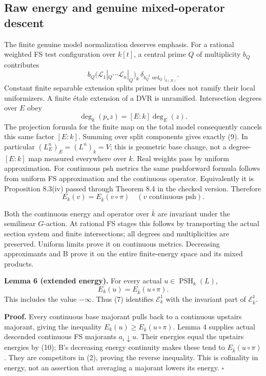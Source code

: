 \documentclass[
  11pt,
]{article}
\begin{document}
\subsection{Raw energy and genuine mixed-operator
descent}\label{raw-energy-and-genuine-mixed-operator-descent}

The finite genuine model normalization deserves emphasis. For a rational
weighted FS test configuration over \(k[t]\), a central prime \(Q\) of
multiplicity \(b_Q\) contributes \[
 b_Q\bigl(\mathcal L_1|_Q\cdots\mathcal L_n|_Q\bigr)_k\,
       \delta_{b_Q^{-1}\operatorname{ord}_Q|_{k(X)}}.
 \tag{9}
\] Constant finite separable extension splits primes but does not ramify
their local uniformizers. A finite étale extension of a DVR is
unramified. Intersection degrees over \(E\) obey \[
 \deg_k(p_*z)=[E:k]\deg_E(z).
\] The projection formula for the finite map on the total model
consequently cancels this same factor \([E:k]\). Summing over split
components gives exactly (9). In particular \((L_E^n)_E=(L^n)_k=V\);
this is geometric base change, not a degree-\([E:k]\) map measured
everywhere over \(k\). Real weights pass by uniform approximation. For
continuous psh metrics the same pushforward formula follows from uniform
FS approximation and the continuous operator. Equivalently it is
Proposition 8.3(iv) passed through Theorem 8.4 in the checked version.
Therefore \[
 E_k(v)=E_{\bar k}(v\circ\pi)
 \quad(v\text{ continuous psh}).
 \tag{10}
\]

Both the continuous energy and operator over \(\bar k\) are invariant
under the semilinear \(G\)-action. At rational FS stages this follows by
transporting the actual section system and finite intersections; all
degrees and multiplicities are preserved. Uniform limits prove it on
continuous metrics. Decreasing approximants and B prove it on the entire
finite-energy space and its mixed products.

\textbf{Lemma 6 (extended energy).} For every actual
\(u\in\operatorname{PSH}_k(L)\), \[
 E_k(u)=E_{\bar k}(u\circ\pi).
 \tag{11}
\] This includes the value \(-\infty\). Thus (7) identifies
\(\mathcal E^1_k\) with the invariant part of \(\mathcal E^1_{\bar k}\).

\textbf{Proof.} Every continuous base majorant pulls back to a
continuous upstairs majorant, giving the inequality
\(E_k(u)\geq E_{\bar k}(u\circ\pi)\). Lemma 4 supplies actual descended
continuous FS majorants \(a_i\downarrow u\). Their energies equal the
upstairs energies by (10); B's decreasing energy continuity makes these
tend to \(E_{\bar k}(u\circ\pi)\). They are competitors in (2), proving
the reverse inequality. This is cofinality in energy, not an assertion
that averaging a majorant lowers its energy. \(\square\)
\end{document}
